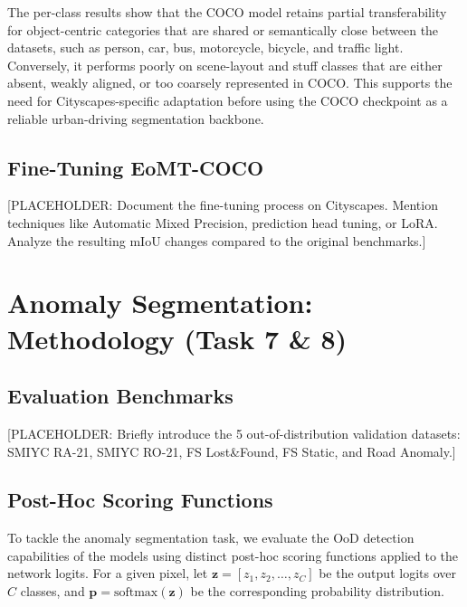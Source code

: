 \documentclass[10pt,conference]{IEEEtran}
\begin{document}
The per-class results show that the COCO model retains partial transferability for object-centric categories that are shared or semantically close between the datasets, such as person, car, bus, motorcycle, bicycle, and traffic light. Conversely, it performs poorly on scene-layout and stuff classes that are either absent, weakly aligned, or too coarsely represented in COCO. This supports the need for Cityscapes-specific adaptation before using the COCO checkpoint as a reliable urban-driving segmentation backbone.

\subsection{Fine-Tuning EoMT-COCO}
[PLACEHOLDER: Document the fine-tuning process on Cityscapes. Mention techniques like Automatic Mixed Precision, prediction head tuning, or LoRA. Analyze the resulting mIoU changes compared to the original benchmarks.]

\section{Anomaly Segmentation: Methodology (Task 7 \& 8)}

\subsection{Evaluation Benchmarks}
[PLACEHOLDER: Briefly introduce the 5 out-of-distribution validation datasets: SMIYC RA-21, SMIYC RO-21, FS Lost\&Found, FS Static, and Road Anomaly.]

\subsection{Post-Hoc Scoring Functions}
To tackle the anomaly segmentation task, we evaluate the OoD detection capabilities of the models using distinct post-hoc scoring functions applied to the network logits. For a given pixel, let $\mathbf{z} = [z_1, z_2, \dots, z_C]$ be the output logits over $C$ classes, and $\mathbf{p} = \text{softmax}(\mathbf{z})$ be the corresponding probability distribution. 
\end{document}
